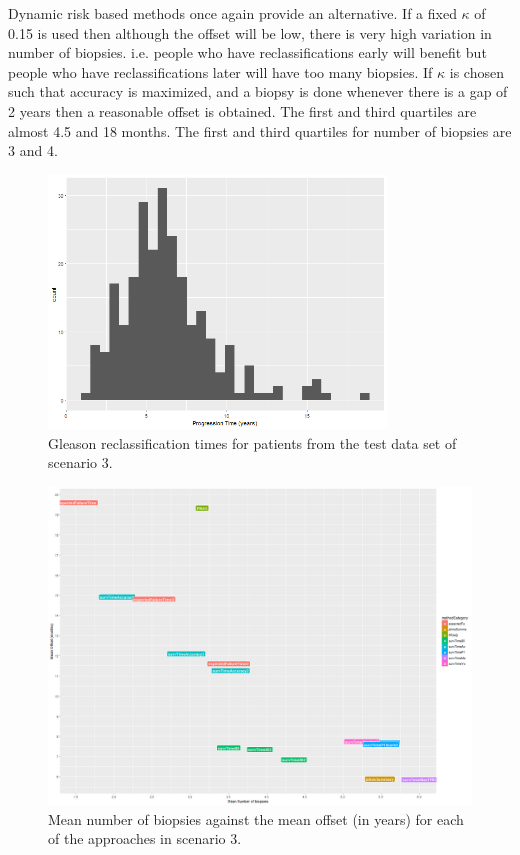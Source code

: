 Dynamic risk based methods once again provide an alternative. If a fixed $\kappa$ of 0.15 is used then although the offset will be low, there is very high variation in number of biopsies. i.e. people who have reclassifications early will benefit but people who have reclassifications later will have too many biopsies. If $\kappa$ is chosen such that accuracy is maximized, and a biopsy is done whenever there is a gap of 2 years then a reasonable offset is obtained. The first and third quartiles are almost 4.5 and 18 months. The first and third quartiles for number of biopsies are 3 and 4. 

\begin{figure}[H]
\centering
\captionsetup{justification=centering}
\includegraphics[width=0.8\textwidth]{sim_study_res_sc_8pt5_sh_3/progression_hist.png}
\caption{\label{fig : sc_8pt5_sh_3_progression_hist} Gleason reclassification times for patients from the test data set of scenario 3.}
\end{figure}

\begin{figure}[H]
\centering
\captionsetup{justification=centering}
\includegraphics[width=\textwidth]{sim_study_res_sc_8pt5_sh_3/mean_offsetvsnb.png}
\caption{\label{fig : sc_8pt5_sh_3_mean_offsetvsnb} Mean number of biopsies against the mean offset (in years) for each of the approaches in scenario 3.}
\end{figure}

